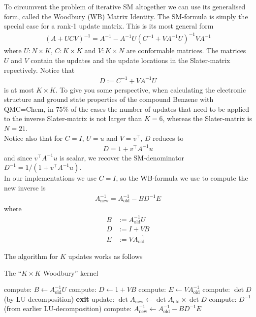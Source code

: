 \documentclass[11pt]{article}
\numberwithin{figure}{section}
\numberwithin{table}{section}
\begin{document}
      To circumvent the problem of iterative SM altogether we can use its generalised form, called the Woodbury (WB) Matrix Identity. The SM-formula is simply the special case for a rank-1 update matrix. This is its most general form
      \begin{align}
        \left(A+UCV\right)^{-1} = A^{-1} - A^{-1}U(C^{-1}+VA^{-1}U)^{-1}VA^{-1}
      \end{align}
      where $U:N\times K$, $C:K\times K$ and $V:K\times N$ are conformable matrices. The matrices $U$ and $V$ contain the updates and the update locations in the Slater-matrix repectively. Notice that
      \begin{align}\label{eqn:wb-denom}
        D:=C^{-1}+VA^{-1}U
      \end{align}  is at most $K\times K$. To give you some perspective, when calculating the electronic structure and ground state properties of the compound Benzene with QMC=Chem, in 75\% of the cases the number of updates that need to be applied to the inverse Slater-matrix is not larger than $K=6$, whereas the Slater-matrix is $N=21$.\\
      
      Notice also that for $C=I$, $U=u$ and $V=v^\top$, $D$ reduces to
      \begin{align}
        D = 1 + v^\top A^{-1} u
      \end{align}
      and since $v^\top A^{-1} u$ is scalar, we recover the SM-denominator $D^{-1}=1/\left(1 + v^\top A^{-1} u\right)$.\\
      
      In our implementations we use $C=I$, so the WB-formula we use to compute the new inverse is
      \begin{align}
        A_{\text{new}}^{-1}=A_{\text{old}}^{-1}-BD^{-1}E
      \end{align}
      where 
      \begin{align}
        B&:=A_{\text{old}}^{-1}U \\
        D&:=I+VB \\
        E&:=VA_{\text{old}}^{-1}
      \end{align}
      
      The algorithm for $K$ updates works as follows\\
      
      \begin{algorithm}[H]
        \caption{The ``$K\times K$ Woodbury'' kernel}\label{algo:woodbury}
        compute: $B \gets A_{\text{old}}^{-1} U$\;
        compute: $D \gets 1 + V B$\;
        compute: $E \gets V A_{\text{old}}^{-1}$\;
        compute: $\det D$ (by LU-decomposition)\;
        {
          \textbf{exit}\;
        }
        update: $\det A_{\text{new}} \gets \det A_{\text{old}}\times\det D$\;
        compute: $D^{-1}$ (from earlier LU-decomposition)\;
        compute: $A_{\text{new}}^{-1} \gets A_{\text{old}}^{-1}-BD^{-1}E$\;
      \end{algorithm}
		
\end{document}
